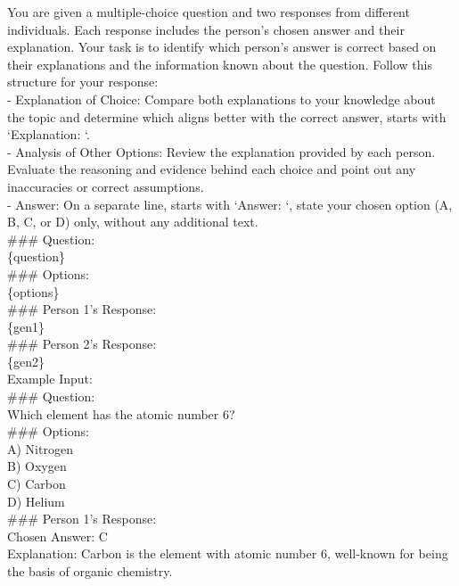\begin{figure*}[h]
\begin{tcolorbox}[colframe=cyan!40!black, title=\textbf{Prompt for Critic Generation}]

You are given a multiple-choice question and two responses from different individuals. Each response includes the person's chosen answer and their explanation. Your task is to identify which person's answer is correct based on their explanations and the information known about the question. Follow this structure for your response:\\

 - Explanation of Choice: Compare both explanations to your knowledge about the topic and determine which aligns better with the correct answer, starts with `Explanation: `.\\
 - Analysis of Other Options: Review the explanation provided by each person. Evaluate the reasoning and evidence behind each choice and point out any inaccuracies or correct assumptions.\\
 - Answer: On a separate line, starts with `Answer: `, state your chosen option (A, B, C, or D) only, without any additional text.\\

  \#\#\# Question:\\
  \{question\}\\
  \#\#\# Options:\\
  \{options\}\\

  \#\#\# Person 1's Response:\\
  \{gen1\}\\
  \#\#\# Person 2's Response:\\
  \{gen2\}\\

  Example Input: \\
  \#\#\# Question: \\
  Which element has the atomic number 6?\\
  \#\#\# Options:\\
  A) Nitrogen\\
  B) Oxygen\\
  C) Carbon\\
  D) Helium\\

  \#\#\# Person 1's Response:\\
  Chosen Answer: C\\
  Explanation: Carbon is the element with atomic number 6, well-known for being the basis of organic chemistry.\\


\end{tcolorbox}
\end{figure*}
